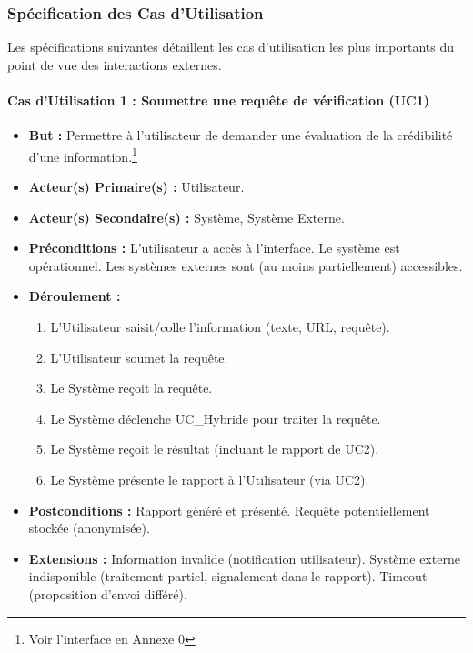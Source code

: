 \documentclass[9pt,twocolumn,french]{article}
\begin{document}
\subsubsection{Spécification des Cas d'Utilisation}

Les spécifications suivantes détaillent les cas d'utilisation les plus importants du point de vue des interactions externes.

\paragraph{Cas d'Utilisation 1 : Soumettre une requête de vérification (UC1)}
\begin{itemize}
    \item \textbf{But :} Permettre à l'utilisateur de demander une évaluation de la crédibilité d'une information.\footnote{Voir l'interface en Annexe 0}
    \item \textbf{Acteur(s) Primaire(s) :} Utilisateur.
    \item \textbf{Acteur(s) Secondaire(s) :} Système, Système Externe.
    \item \textbf{Préconditions :} L'utilisateur a accès à l'interface. Le système est opérationnel. Les systèmes externes sont (au moins partiellement) accessibles.
    \item \textbf{Déroulement  :}
        \begin{enumerate}
            \item L'Utilisateur saisit/colle l'information (texte, URL, requête).
            \item L'Utilisateur soumet la requête.
            \item Le Système reçoit la requête.
            \item Le Système déclenche UC\_Hybride pour traiter la requête.
            \item Le Système reçoit le résultat (incluant le rapport de UC2).
            \item Le Système présente le rapport à l'Utilisateur (via UC2).
        \end{enumerate}
    \item \textbf{Postconditions :} Rapport généré et présenté. Requête potentiellement stockée (anonymisée).
    \item \textbf{Extensions :} Information invalide (notification utilisateur). Système externe indisponible (traitement partiel, signalement dans le rapport). Timeout (proposition d'envoi différé).
\end{itemize}
\end{document}
